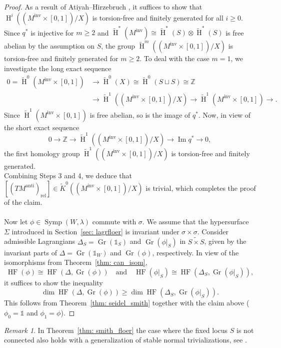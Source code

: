 \documentclass[12pt]{article}
\renewcommand{\ge}{\geqslant}
\theoremstyle{theorem}
\theoremstyle{definition}
\theoremstyle{remark}
\newtheorem{remark}[theorem]{Remark}
\numberwithin{equation}{section}
\newcommand{\Z}{{\mathbb{Z}}}
\DeclareMathOperator{\anti}{anti}
\DeclareMathOperator{\inv}{inv}
\DeclareMathOperator{\rel}{rel}
\DeclareMathOperator{\Gr}{Gr}
\DeclareMathOperator{\im}{Im}
\DeclareMathOperator{\Symp}{Symp}
\DeclareMathOperator{\HF}{HF}
\DeclareMathOperator{\Ho}{H}
\begin{document}
\begin{proof}
As a result of Atiyah--Hirzebruch \cite[Proposition~6.10]{He12}, it suffices to show that $\Ho^i((M^{\inv}\times [0,1])/X)$ is torsion-free and finitely generated for all $i\ge 0$.
Since $q^*$ is injective for $m\ge 2$ and $\widetilde{\Ho}^*(M^{\inv})\cong \widetilde{\Ho}^*(S)\otimes \widetilde{\Ho}^*(S)$ is free abelian by the assumption on $S$, the group $\widetilde{\Ho}^m((M^{\inv}\times [0,1])/X)$ is torsion-free and finitely generated for $m\ge 2$.
To deal with the case $m=1$, we investigate the long exact sequence
\begin{align*}
0=\widetilde{\Ho}^0(M^{\inv}\times [0,1]) &\to \widetilde{\Ho}^0(X) \cong \widetilde{\Ho}^0(S\sqcup S)\cong \Z \\
& \to \widetilde{\Ho}^{1}((M^{\inv}\times [0,1])/X)\to \widetilde{\Ho}^{1}(M^{\inv}\times [0,1]) \to.
\end{align*}
Since $\widetilde{\Ho}^{1}(M^{\inv}\times [0,1])$ is free abelian, so is the image of $q^*$.
Now, in view of the short exact sequence
$$
0 \to \Z \to  \widetilde{\Ho}^{1}((M^{\inv}\times [0,1])/X)  \to \im q^* \to 0,
$$
the first homology group $\widetilde{\Ho}^{1}((M^{\inv}\times [0,1])/X)$ is torsion-free and finitely generated.\\

Combining Steps 3 and 4, we deduce that $[(TM^{\anti})_{\rel}]\in \widetilde{K}^0((M^{\inv}\times [0,1])/X)$ is trivial, which completes the proof of the claim.\\\\
Now let $\phi\in\Symp(W,\lambda)$ commute with $\sigma$.
We assume that the hypersurface $\Sigma$ introduced in Section~\ref{sec: lagrfloer} is invariant under $\sigma\times\sigma$.
Consider admissible Lagrangians $\Delta_S=\Gr(\mathds{1}_S)$ and $\Gr(\phi|_S)$ in $\widetilde{S\times S}$, given by the invariant parts of $\Delta=\Gr(\mathds{1}_W)$ and $\Gr(\phi)$, respectively.
In view of the isomorphisms from Theorem~\ref{thm: can_isom},
$$
\HF(\phi)\cong \HF(\Delta,\Gr(\phi))\quad \text{and} \quad \HF(\phi|_S)\cong \HF(\Delta_S,\Gr(\phi|_S)),
$$
it suffices to show the inequality
$$
	\dim \HF(\Delta,\Gr(\phi))\ge \dim \HF(\Delta_S,\Gr(\phi|_S)).
$$
This follows from Theorem~\ref{thm: seidel_smith} together with the claim above ($\phi_0=\mathds{1}$ and $\phi_1=\phi$).
\end{proof}

\begin{remark}
In Theorem~\ref{thm: smith_floer} the case where the fixed locus $S$ is not connected also holds with a generalization of stable normal trivializations, see \cite[Section~3.5]{SS}.
\end{remark}
\end{document}
